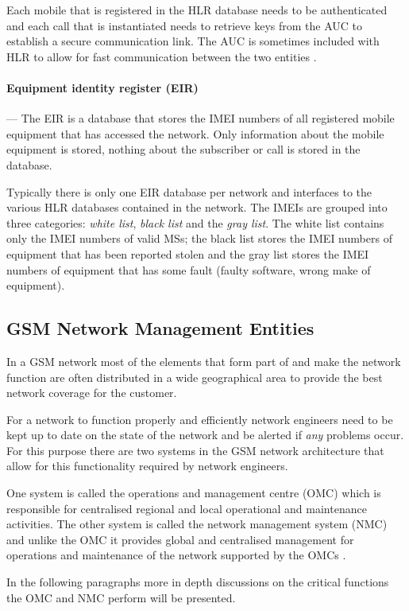 Each mobile that is registered in the HLR database needs to be authenticated and each call that is instantiated needs to retrieve keys from the AUC to establish a secure communication link\cite{GSM92,GSMSysEngin}. The AUC is sometimes included with HLR to allow for fast communication between the two entities \cite{GSMSysEngin}.

\paragraph{Equipment identity register (EIR)}
--- The EIR is a database that stores the IMEI numbers of all registered mobile equipment that has accessed the network. Only information about the mobile equipment is stored, nothing about the subscriber or call is stored in the database.

Typically there is only one EIR database per network and interfaces to the various HLR databases contained in the network. The IMEIs are grouped into three categories: \emph{white list}, \emph{black list} and the \emph{gray list}. The white list contains only the IMEI numbers of valid MSs; the black list stores the IMEI numbers of equipment that has been reported stolen and the gray list stores the IMEI numbers of equipment that has some fault (faulty software, wrong make of equipment).

\subsection{GSM Network Management Entities}
In a GSM network most of the elements that form part of and make the network function are often distributed in a wide geographical area to provide the best network coverage for the customer. 

For a network to function properly and efficiently network engineers need to be kept up to date on the state of the network and be alerted if \emph{any} problems occur. For this purpose there are two systems in the GSM network architecture that allow for this functionality required by network engineers. 

One system is called the operations and management centre (OMC) which is responsible for centralised regional and local operational and maintenance activities. The other system is called the network management system (NMC) and unlike the OMC it provides global and centralised management for operations and maintenance of the network supported by the OMCs \cite{GSMSysEngin}.

In the following paragraphs more in depth discussions on the critical functions the OMC and NMC perform will be presented.


